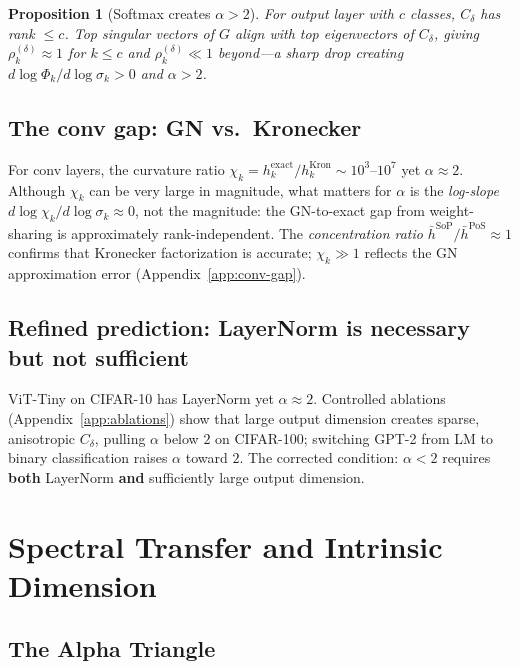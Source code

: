 \documentclass{article}
\newtheorem{proposition}[theorem]{Proposition}
\begin{document}
\begin{proposition}[Softmax creates $\alpha > 2$]\label{prop:softmax}
For output layer with $c$ classes, $C_\delta$ has rank $\leq c$. Top singular vectors of $G$ align with top eigenvectors of $C_\delta$, giving $\rho_k^{(\delta)} \approx 1$ for $k \leq c$ and $\rho_k^{(\delta)} \ll 1$ beyond---a sharp drop creating $d\log\Phi_k/d\log\sigma_k > 0$ and $\alpha > 2$.
\end{proposition}

\subsection{The conv gap: GN vs.\ Kronecker}\label{sec:conv-gap}

For conv layers, the curvature ratio $\chi_k = h_k^{\mathrm{exact}}/h_k^{\mathrm{Kron}} \sim 10^3$--$10^7$ yet $\alpha \approx 2$. Although $\chi_k$ can be very large in magnitude, what matters for $\alpha$ is the \emph{log-slope} $d\log\chi_k/d\log\sigma_k \approx 0$, not the magnitude: the GN-to-exact gap from weight-sharing is approximately rank-independent. The \emph{concentration ratio} $\bar{h}^{\mathrm{SoP}}/\bar{h}^{\mathrm{PoS}} \approx 1$ confirms that Kronecker factorization is accurate; $\chi_k \gg 1$ reflects the GN approximation error (Appendix~\ref{app:conv-gap}).

\subsection{Refined prediction: LayerNorm is necessary but not sufficient}

ViT-Tiny on CIFAR-10 has LayerNorm yet $\alpha \approx 2$. Controlled ablations (Appendix~\ref{app:ablations}) show that large output dimension creates sparse, anisotropic $C_\delta$, pulling $\alpha$ below $2$ on CIFAR-100; switching GPT-2 from LM to binary classification raises $\alpha$ toward $2$. The corrected condition: $\alpha < 2$ requires \textbf{both} LayerNorm \textbf{and} sufficiently large output dimension.

\section{Spectral Transfer and Intrinsic Dimension}\label{sec:spectral}

\subsection{The Alpha Triangle}
\end{document}
